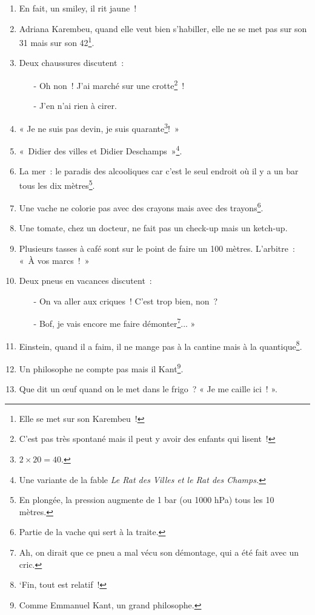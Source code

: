 \documentclass[10pt,a5paper,fullpage]{book}
\begin{document}
\begin{enumerate}
\begin{itemize}
		\end{itemize}			
		\item En fait, un smiley, il rit jaune~!
		\item Adriana Karembeu, quand elle veut bien s’habiller, elle ne se met pas sur son 31 mais sur son 42\footnote{Elle se met sur son Karembeu~!}.
		\item Deux chaussures discutent~:
		\begin{itemize}
			\item[-] Oh non~! J'ai marché sur une crotte\footnote{C'est pas très spontané mais il peut y avoir des enfants qui lisent~!}~! 
			\item[-] J'en n’ai rien à cirer. 
		\end{itemize}
		\item « Je ne suis pas devin, je suis quarante\footnote{$2\times20 = 40$.}!~»
		\item «~Didier des villes et Didier Deschamps~»\footnote{Une variante de la fable \textit{Le Rat des Villes et le Rat des Champs.}}.
		\item La mer~: le paradis des alcooliques car c’est le seul endroit où il y a un bar tous les dix mètres\footnote{En plongée, la pression augmente de 1 bar (ou 1000 hPa) tous les 10 mètres.}.
		\item Une vache ne colorie pas avec des crayons mais avec des trayons\footnote{Partie de la vache qui sert à la traite.}.
		\item Une tomate, chez un docteur, ne fait pas un check-up mais un ketch-up.
		\item Plusieurs tasses à café sont sur le point de faire un 100 mètres. L’arbitre~: «~À vos marcs~!~»
		\item Deux pneus en vacances discutent~:
		\begin{itemize}
			\item[-] On va aller aux criques~! C'est trop bien, non~?
			\item[-] Bof, je vais encore me faire démonter\footnote{Ah, on dirait que ce pneu a mal vécu son démontage, qui a été fait avec un cric.}... »
		\end{itemize}			
		\item Einstein, quand il a faim, il ne mange pas à la cantine mais à la quantique\footnote{‘Fin, tout est relatif~!}.
		\item Un philosophe ne compte pas mais il Kant\footnote{Comme Emmanuel Kant, un grand philosophe.}.
		\item Que dit un \oe{}uf quand on le met dans le frigo~? « Je me caille ici~! ».

\end{enumerate}
\end{document}
